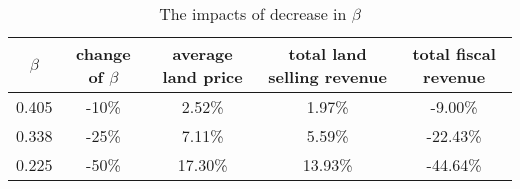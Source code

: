 \begin{table}[H]
\centering
\caption{The impacts of decrease in $\beta$}
\label{table: decrease_beta}
\begin{tabular}{ccccc}
\toprule
$\beta$ & change of $\beta$ & average land price & total land selling revenue & total fiscal revenue \\
\midrule
0.405 & -10\% & 2.52\% & 1.97\% & -9.00\% \\
0.338 & -25\% & 7.11\% & 5.59\% & -22.43\% \\
0.225 & -50\% & 17.30\% & 13.93\% & -44.64\% \\
\bottomrule
\end{tabular}
\end{table}
